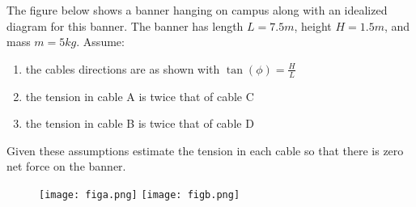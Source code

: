 

The figure below shows a banner hanging on campus along with an idealized diagram for this banner. The banner has length $L = 7.5m$, height $H = 1.5m$, and mass $m = 5kg$. Assume:
\begin{enumerate}
  \item the cables directions are as shown with $\tan(\phi) = \frac{H}{L}$
  \item the tension in cable A is twice that of cable C
  \item the tension in cable B is twice that of cable D
\end{enumerate}
Given these assumptions estimate the tension in each cable so that there is zero net force on the banner.

\begin{figure}[ht!]
  \centering
  \texttt{[image: figa.png]}
  \texttt{[image: figb.png]}
\end{figure}

\iftoggle{flagSoln}{%
\vspace{.5cm}
\rule{\textwidth}{.4pt}
\vspace{.5cm}
\textbf{Solution:}
\begin{figure}[ht!]
  \centering
  \texttt{[image: soln.png]}
\end{figure}
}{%
}%
